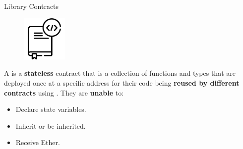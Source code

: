 \documentclass[handout]{beamer}
\begin{document}
\begin{frame}{Library Contracts}

\begin{minipage}{0.25\textwidth}
	\begin{figure}
		\center
		\includegraphics[width= 2.2cm]{../assets/images/library.png}	
	\end{figure}
\end{minipage}
\begin{minipage}{0.7\textwidth}
	\vspace{1em}
	A  is a \textbf{stateless} contract that is a collection of functions and types that are deployed once at a specific address for their code being \textbf{reused by different contracts} using . They are \textbf{unable} to:

	\begin{itemize}
		\item	Declare state variables.
		\item	Inherit or be inherited.
		\item	Receive Ether.
	\end{itemize}
\end{minipage}

\vspace{1em}


\end{frame}
\end{document}
